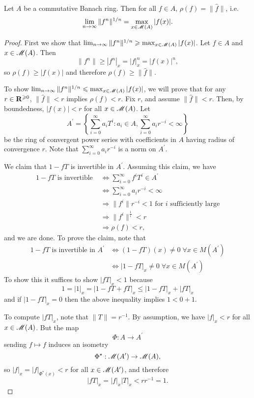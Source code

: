 \begin{theorem}
Let $A$ be a commutative Banach ring. Then for all $f\in A$, 
$\rho(f) = \|\hat f\|$, i.e.~
\[
  \lim_{n\to \infty} \|f^n\|^{1/n} = \max_{x\in \operatorname{\mathscr{M}}(A)} |f(x)| .
\]
\end{theorem}
\begin{proof}
First we show that 
$\lim_{n\to \infty} \|f^n\|^{1/n} \geqslant \max_{x\in \operatorname{\mathscr{M}}(A)} |f(x)|$. 
Let $f\in A$ and $x\in\operatorname{\mathscr{M}}(A)$. Then
\[
  \|f^n\| \geqslant |f^n|_x=|f|_x^n=|f(x)|^n,
\]
so $\rho(f)\geqslant |f(x)|$ and therefore $\rho(f)\geqslant \|\hat f\|$.

To show $\lim_{n\to \infty} \|f^n\|^{1/n} \leqslant \max_{x\in \operatorname{\mathscr{M}}(A)} |f(x)|$, 
we will prove that for any $r\in \mathbf{R}^{\geqslant 0}$, $\|\hat f \|<r$ implies 
$\rho(f)<r$. Fix $r$, and assume $\|\hat f\|<r$. Then, by boundedness, 
$|f(x)|<r$ for all $x\in\operatorname{\mathscr{M}}(A)$. Let
\[
  A^\prime=\left\{ \sum_{i=0}^\infty a_iT^i : a_i\in A, \sum_{i=0}^\infty a_ir^{-i}<\infty \right\}
\]
be the ring of convergent power series with coefficients in $A$ having radius 
of convergence $r$. Note that $\sum_{i=0}^\infty a_ir^{-i}$ is a norm on 
$A^\prime$.

We claim that $1-fT$ is invertible in $A^\prime$. Assuming this claim, we have
\begin{align*}
  1-fT\text{ is invertible } 
    &\Leftrightarrow \sum_{i=0}^\infty f^iT^i\in A^\prime \\
    &\Leftrightarrow \sum_{i=0}^\infty a_ir^{-i}<\infty \\
    &\Rightarrow \| f^i \|r^{-i}<1 \text{ for }i\text{ sufficiently large} \\
    &\Rightarrow \|f^i\|^{\frac{1}{i}}<r \\
    &\Rightarrow \rho(f)<r,
\end{align*}
and we are done. To prove the claim, note that 
\begin{align*}
  1-fT\text{ is invertible in }A^\prime 
    &\Leftrightarrow (1-fT)(x)\neq 0 \;\forall x\in M(A^\prime) \\
    &\Leftrightarrow |1-fT|_x\neq 0 \;\forall x\in M(A^\prime)
\end{align*}
To show this it suffices to show $|fT|_x<1$ because
\[
  1=|1|_x=|1-fT+fT|_x\leqslant |1-fT|_x+|fT|_x
\]
and if $|1-fT|_x=0$ then the above inequality implies $1<0+1$.

To compute $|fT|_x$, note that $\|T\|=r^{-1}$. By assumption, we have $|f|_x<r$ 
for all $x\in \operatorname{\mathscr{M}}(A)$. But the map
\[
  \Phi:A\to A^\prime
\]
sending $f\mapsto f$ induces an isometry
\[
  \Phi^\star:\operatorname{\mathscr{M}}(A^\prime)\to\operatorname{\mathscr{M}}(A),
\]
so $|f|_x=|f|_{\Phi^*(x)}<r$ for all $x\in \operatorname{\mathscr{M}}(A^\prime)$, and therefore
\[
|fT|_x=|f|_x|T|_x<rr^{-1}=1.
\]
\end{proof}
